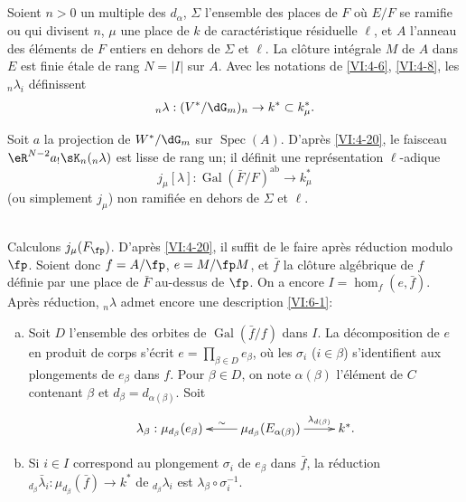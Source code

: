 \documentclass[oneside]{book}
\DeclareMathOperator{\gal}{Gal}
\DeclareMathOperator{\spec}{Spec}
\theoremstyle{sga-source}
\theoremstyle{sga-source-dash}
\theoremstyle{sga-source-dotdash}
\theoremstyle{sga-source-number-note-dash}
\theoremstyle{sga-source-note-number-dotdash}
\theoremstyle{sga-source-example-dotdash}
\theoremstyle{sga-source-inline-number}
\theoremstyle{sga-source-bare-number}
\theoremstyle{sga-source}
\newcommand{\PrintPage}[1]{}\newcommand{\MathPage}[1]{}\newcommand{\PrintCite}[2]{#1}\newcommand{\var}[3]{#1}
\begin{document}
\subsection{}\label{VI:6-2}

Soient $n>0$ un multiple des $d_\alpha$, $\Sigma$ l'ensemble des places de $F$ 
où $E/F$ se ramifie ou qui divisent $n$, $\mu$ une place de $k$ de 
caractéristique résiduelle $\ell$, et $A$ l'anneau des éléments de $F$ 
entiers en dehors de $\Sigma$ et $\ell$. La clôture intégrale $M$ de $A$ dans $E$ 
est finie étale de rang $N=|I|$ sur $A$. Avec les notations de \ref{VI:4-6}, 
\ref{VI:4-8}, les $_n \lambda_i$ définissent 
\[
  _n\lambda:(V^\ast/\dG_m)_n \to k^\ast \subset k_\mu^\ast \text{.} 
\]

Soit $a$ la projection de $W^\ast/\dG_m$ sur $\spec(A)$. D'après 
\ref{VI:4-20}, le faisceau $\eR^{N-2} a_! \sK_n(_n \lambda)$ est lisse de rang 
un; il définit une représentation $\ell$-adique 
\[
  j_\mu[\lambda]:\gal(\bar F/F)^\text{ab} \to k_\mu^\ast 
\]
(ou simplement $j_\mu$) non ramifiée en dehors de $\Sigma$ et $\ell$. 





\subsection{}\label{VI:6-3}

Calculons $j_\mu(F_\fp)$. D'après \ref{VI:4-20}, il suffit de le faire 
après réduction modulo $\fp$. Soient donc $f=A/\fp$, $e=M/\fp  M$, et 
$\bar f$ la clôture algébrique de $f$ définie par une place de $\bar F$ 
au-dessus de $\fp$. On a encore $I=\hom_f(e,\bar f)$. Après réduction, 
$_n\lambda$ admet encore une description \ref{VI:6-1}: 
\begin{enumerate}[a)]
  \item Soit $D$ l'ensemble des orbites de $\gal(\bar f/f)$ dans $I$. La 
    décomposition de $e$ en produit de corps s'écrit 
    $e=\prod_{\beta\in D} e_\beta$, où les $\sigma_i$ ($i\in \beta$) 
    s'identifient aux \var{plongements de $e_\beta$ dans $f$}{plongements de $e_\beta$ dans $\bar f$}{S45-SOL-0898}. Pour $\beta\in D$, on 
    note $\alpha(\beta)$ l'élément de $C$ \PrintPage{215}
contenant $\beta$ et 
    $d_\beta=d_{\alpha(\beta)}$. Soit 
    \[\xymatrix{
      \lambda_\beta : \mu_{d_\beta}(e_\beta) 
        & \ar[l]_-\sim \mu_{d_\beta}(E_{\alpha(\beta)}) \ar[r]^-{\var{\lambda_{d(\beta)}}{\lambda_{\alpha(\beta)}}{S45-SOL-0899}} 
        & k^\ast \text{.} 
    }\]
  \item Si $i\in I$ correspond au plongement $\sigma_i$ de $e_\beta$ dans 
    $\bar f$, la réduction 
    $_{d_\beta} \bar\lambda_i:\mu_{d_\beta}(\bar f) \to k^\ast$ de 
    $_{d_\beta} \lambda_i$ est 
    $\lambda_\beta \circ \sigma_i^{-1}$. 
\end{enumerate}
\end{document}
